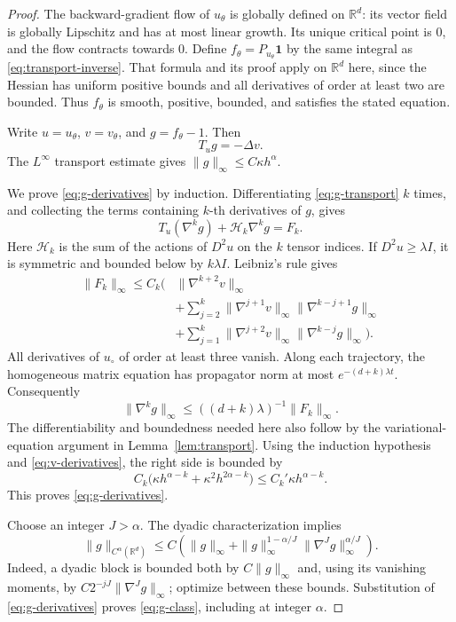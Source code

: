\documentclass[11pt]{article}
\theoremstyle{remark}
\newcommand{\R}{\mathbb R}
\newcommand{\one}{\mathbf 1}
\begin{document}
\begin{proof}
The backward-gradient flow of \(u_\theta\) is globally defined on
\(\R^d\): its vector field is globally Lipschitz and has at most
linear growth. Its unique critical point is \(0\), and the flow
contracts towards \(0\).
Define \(f_\theta=P_{u_\theta}\one\) by the same integral as
\eqref{eq:transport-inverse}. That formula and its proof apply on
\(\R^d\) here, since the Hessian has uniform positive bounds and
all derivatives of order at least two are bounded.
Thus \(f_\theta\) is smooth, positive, bounded, and satisfies the
stated equation.

Write \(u=u_\theta\), \(v=v_\theta\), and \(g=f_\theta-1\).
Then
\begin{equation}\label{eq:g-transport}
T_ug=-\Delta v.
\end{equation}
The \(L^\infty\) transport estimate gives
\(\|g\|_\infty\leq C\kappa h^\alpha\).

We prove \eqref{eq:g-derivatives} by induction.
Differentiating \eqref{eq:g-transport} \(k\) times, and collecting
the terms containing \(k\)-th derivatives of \(g\), gives
\[
T_u(\nabla^kg)+\mathscr H_k\nabla^kg=F_k.
\]
Here \(\mathscr H_k\) is the sum of the actions of \(D^2u\) on
the \(k\) tensor indices. If \(D^2u\geq\lambda I\), it is symmetric
and bounded below by \(k\lambda I\). Leibniz's rule gives
\begin{align*}
\|F_k\|_\infty\leq C_k\bigg(
&\|\nabla^{k+2}v\|_\infty\\
&+\sum_{j=2}^k
\|\nabla^{j+1}v\|_\infty
\|\nabla^{k-j+1}g\|_\infty\\
&+\sum_{j=1}^k
\|\nabla^{j+2}v\|_\infty
\|\nabla^{k-j}g\|_\infty
\bigg).
\end{align*}
All derivatives of \(u_\circ\) of order at least three vanish.
Along each trajectory, the homogeneous matrix equation has
propagator norm at most \(e^{-(d+k)\lambda t}\).
Consequently
\[
\|\nabla^kg\|_\infty
\leq ((d+k)\lambda)^{-1}\|F_k\|_\infty.
\]
The differentiability and boundedness needed here also follow by the
variational-equation argument in Lemma~\ref{lem:transport}.
Using the induction hypothesis and \eqref{eq:v-derivatives}, the
right side is bounded by
\[
C_k\big(\kappa h^{\alpha-k}
+\kappa^2h^{2\alpha-k}\big)
\leq C_k'\kappa h^{\alpha-k}.
\]
This proves \eqref{eq:g-derivatives}.

Choose an integer \(J>\alpha\). The dyadic characterization implies
\[
\|g\|_{C^\alpha(\R^d)}
\leq C\left(
\|g\|_\infty+
\|g\|_\infty^{1-\alpha/J}
\|\nabla^Jg\|_\infty^{\alpha/J}
\right).
\]
Indeed, a dyadic block is bounded both by \(C\|g\|_\infty\) and,
using its vanishing moments, by
\(C2^{-jJ}\|\nabla^Jg\|_\infty\); optimize between these bounds.
Substitution of \eqref{eq:g-derivatives} proves
\eqref{eq:g-class}, including at integer \(\alpha\).


\end{proof}
\end{document}
